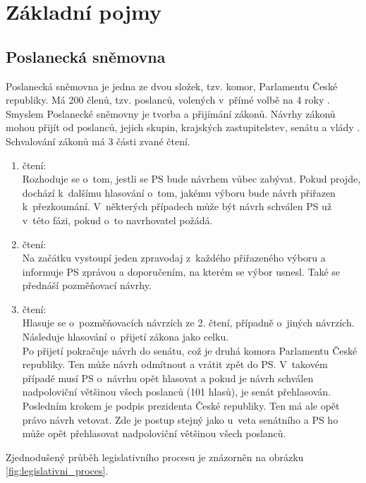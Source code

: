 \section{Základní pojmy}

\subsection{Poslanecká sněmovna}
Poslanecká sněmovna je jedna ze dvou složek, tzv. komor, Parlamentu České republiky. Má 200 členů, tzv. poslanců, volených v~přímé volbě na 4 roky \cite{ustava-parlament}.  \\
Smyslem Poslanecké sněmovny je tvorba a přijímání zákonů. Návrhy zákonů mohou přijít od poslanců, jejich skupin, krajských zastupitelstev, senátu a vlády \cite{ustava-navrh_zakona}.  \\
Schvalování zákonů má 3 části zvané čtení.
\begin{enumerate}
    \item čtení: \\
    Rozhoduje se o~tom, jestli se PS bude návrhem vůbec zabývat. Pokud projde, dochází k~dalšímu hlasování o~tom, jakému výboru bude návrh přiřazen k~přezkoumání.
    V~některých případech může být návrh schválen PS už v~této fázi, pokud o~to navrhovatel požádá.
    \item čtení: \\
    Na začátku vystoupí jeden zpravodaj z~každého přiřazeného výboru a informuje PS zprávou a doporučením, na kterém se výbor usnesl. Také se přednáší pozměňovací návrhy.
    \item čtení: \\
    Hlasuje se o~pozměňovacích návrzích ze 2. čtení, případně o~jiných návrzích. Následuje hlasování o~přijetí zákona jako celku.\\
    Po přijetí pokračuje návrh do senátu, což je druhá komora Parlamentu České republiky. Ten může návrh odmítnout a vrátit zpět do PS. V~takovém případě musí PS o~návrhu opět hlasovat a pokud je návrh schválen nadpoloviční většinou všech poslanců (101 hlasů), je senát přehlasován. Posledním krokem je podpis prezidenta České republiky. Ten má ale opět právo návrh vetovat. Zde je postup stejný jako u~veta senátního a PS ho může opět přehlasovat nadpoloviční většinou všech poslanců.
\end{enumerate}
Zjednodušený průběh legislativního procesu je znázorněn na obrázku \ref{fig:legislativni_proces}.

